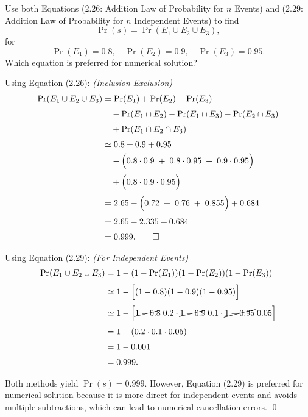 \begin{hwkProblem}{7}{}

	Use both Equations (2.26: Addition Law of Probability for \(n\) Events) and (2.29: Addition Law of Probability for \(n\) Independent Events) to find 
	\[
		\operatorname{Pr}(s)=\operatorname{Pr}\left(E_1 \cup E_2 \cup E_3\right),
	\]
	for
	\[
		\operatorname{Pr}(E_1)=0.8,\quad \operatorname{Pr}(E_2)=0.9,\quad \operatorname{Pr}(E_3)=0.95.
	\]
	Which equation is preferred for numerical solution?

	\hwkSol

	\hwkPart

	Using Equation (2.26): \emph{(Inclusion-Exclusion)}
	\begin{align*}
		\Pr(E_1\cup E_2\cup E_3) &= \Pr(E_1)+\Pr(E_2)+\Pr(E_3)\\[1mm]
					 &\quad -\Pr(E_1\cap E_2)-\Pr(E_1\cap E_3)-\Pr(E_2\cap E_3)\\[1mm]
					 &\quad +\Pr(E_1\cap E_2\cap E_3)\\[1mm]
					 &\simeq 0.8+0.9+0.95 \\
					 &\quad -\Bigl(0.8\cdot 0.9 \;+\; 0.8\cdot 0.95 \;+\; 0.9\cdot 0.95\Bigr)\\[1mm]
					 &\quad +\Bigl(0.8\cdot 0.9\cdot 0.95\Bigr)\\[1mm]
					 &= 2.65 - \Bigl(0.72\;+\; 0.76\;+\; 0.855\Bigr) + 0.684\\[1mm]
					 &= 2.65 - 2.335 + 0.684\\[1mm]
					 &= 0.999. \qed
	\end{align*}

	\hwkPart

	Using Equation (2.29): \emph{(For Independent Events)}
	\begin{align*}
		\Pr(E_1\cup E_2\cup E_3) &= 1 - (1-\Pr(E_1))(1-\Pr(E_2))(1-\Pr(E_3))\\[1mm]
					 &\simeq 1 - \Bigl[(1-0.8)(1-0.9)(1-0.95)\Bigr]\\[1mm]
					 &\simeq 1 - \Bigl[\cancel{1-0.8}\;0.2\cdot \cancel{1-0.9}\;0.1\cdot \cancel{1-0.95}\;0.05\Bigr]\\[1mm]
					 &= 1 - (0.2\cdot 0.1\cdot 0.05)\\[1mm]
					 &= 1 - 0.001\\[1mm]
					 &= 0.999.
	\end{align*}

	\hwkPart

	Both methods yield \(\operatorname{Pr}(s)=0.999\). However, Equation (2.29) is preferred for numerical solution because it is more direct for independent events and avoids multiple subtractions, which can lead to numerical cancellation errors. \qed

\end{hwkProblem}

